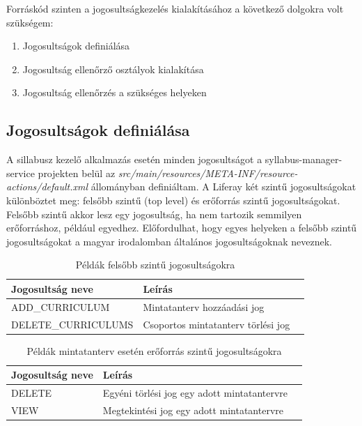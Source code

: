 \documentclass[hidelinks, 12pt, a4paper]{report}
\begin{document}
Forráskód szinten a jogosultságkezelés kialakításához a következő dolgokra volt szükségem:
\begin{enumerate}
\item Jogosultságok definiálása
\item Jogosultság ellenőrző osztályok kialakítása
\item Jogosultság ellenőrzés a szükséges helyeken
\end{enumerate}

\subsection{Jogosultságok definiálása}

A sillabusz kezelő alkalmazás esetén minden jogosultságot a syllabus-manager-service projekten belül az \emph{src/main/resources/META-INF/resource-actions/default.xml} állományban definiáltam. A Liferay két szintű jogosultságokat különböztet meg: felsőbb szintű (top level) és erőforrás szintű jogosultságokat. Felsőbb szintű akkor lesz egy jogosultság, ha nem tartozik semmilyen erőforráshoz, például egyedhez. Előfordulhat, hogy egyes helyeken a felsőbb szintű jogosultságokat a magyar irodalomban általános jogosultságoknak neveznek.

\begin{table}[H]
	\caption{Példák felsőbb szintű jogosultságokra}
	\centering
	\begin{tabular}{| l | l | l |}
	\hline
	\textbf{Jogosultság neve} & \textbf{Leírás} \\
	\hline
	ADD\_CURRICULUM & Mintatanterv hozzáadási jog \\
	\hline
	DELETE\_CURRICULUMS & Csoportos mintatanterv törlési jog \\
	\hline
\end{tabular}
\end{table}

\begin{table}[H]
	\caption{Példák mintatanterv esetén erőforrás szintű jogosultságokra}
	\centering
	\begin{tabular}{| l | l | l |}
	\hline
	\textbf{Jogosultság neve} & \textbf{Leírás} \\
	\hline
	DELETE & Egyéni törlési jog egy adott mintatantervre \\
	\hline
	VIEW & Megtekintési jog egy adott mintatantervre \\
	\hline
\end{tabular}
\end{table}
\end{document}

